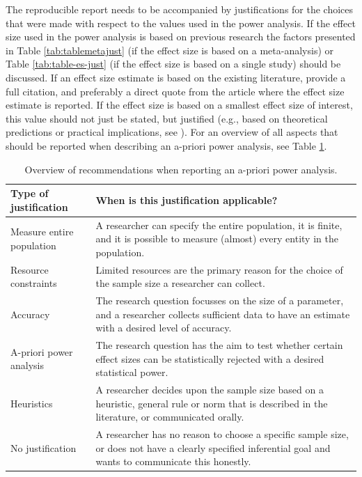 \documentclass[
]{krantz}
\begin{document}
The reproducible report needs to be accompanied by justifications for the choices that were made with respect to the values used in the power analysis. If the effect size used in the power analysis is based on previous research the factors presented in Table \ref{tab:tablemetajust} (if the effect size is based on a meta-analysis) or Table \ref{tab:table-es-just} (if the effect size is based on a single study) should be discussed. If an effect size estimate is based on the existing literature, provide a full citation, and preferably a direct quote from the article where the effect size estimate is reported. If the effect size is based on a smallest effect size of interest, this value should not just be stated, but justified (e.g., based on theoretical predictions or practical implications, see \citet{lakens_equivalence_2018}). For an overview of all aspects that should be reported when describing an a-priori power analysis, see Table \ref{tab:table-pow-rec-2}.

\begin{table}

\caption{\label{tab:table-pow-rec-2}Overview of recommendations when reporting an a-priori power analysis.}
\centering
\begin{tabular}[t]{l|l}
\hline
Type of justification & When is this justification applicable?\\
\hline
Measure entire population & A researcher can specify the entire population, it is finite, and it is possible to measure (almost) every entity in the population.\\
\hline
Resource constraints & Limited resources are the primary reason for the choice of the sample size a researcher can collect.\\
\hline
Accuracy & The research question focusses on the size of a parameter, and a researcher collects sufficient data to have an estimate with a desired level of accuracy.\\
\hline
A-priori power analysis & The research question has the aim to test whether certain effect sizes can be statistically rejected with a desired statistical power.\\
\hline
Heuristics & A researcher decides upon the sample size based on a heuristic, general rule or norm that is described in the literature, or communicated orally.\\
\hline
No justification & A researcher has no reason to choose a specific sample size, or does not have a clearly specified inferential goal and wants to communicate this honestly.\\
\hline
\end{tabular}
\end{table}
\end{document}
